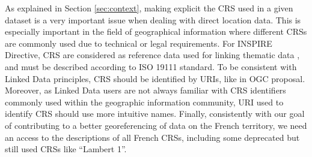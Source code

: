 As explained in Section \ref{sec:context}, making explicit the CRS used in a given dataset is a very important issue when dealing with direct location data. This is especially important in the field of geographical information where different CRSs are commonly used due to technical or legal requirements. For INSPIRE Directive, CRS are considered as reference data used for linking thematic data \cite{inspire2009}, and must be described according to ISO 19111 standard. To be consistent with Linked Data principles, CRS should be identified by URIs, like in OGC proposal. Moreover, as Linked Data users are not always familiar with CRS identifiers commonly used within the geographic information community, URI used to identify CRS should use more intuitive names. Finally, consistently with our goal of contributing to a better georeferencing of data on the French territory, we need an access to the descriptions of all French CRSs, including some deprecated but still used CRSs like ``Lambert 1''.

\begin{table}[!htp]
\end{table}

